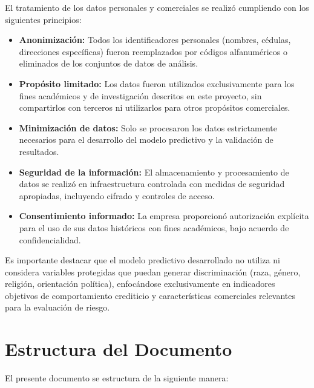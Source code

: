 El tratamiento de los datos personales y comerciales se realizó cumpliendo con los siguientes principios:

\begin{itemize}
    \item \textbf{Anonimización:} Todos los identificadores personales (nombres, cédulas, direcciones específicas) fueron reemplazados por códigos alfanuméricos o eliminados de los conjuntos de datos de análisis.
    
    \item \textbf{Propósito limitado:} Los datos fueron utilizados exclusivamente para los fines académicos y de investigación descritos en este proyecto, sin compartirlos con terceros ni utilizarlos para otros propósitos comerciales.
    
    \item \textbf{Minimización de datos:} Solo se procesaron los datos estrictamente necesarios para el desarrollo del modelo predictivo y la validación de resultados.
    
    \item \textbf{Seguridad de la información:} El almacenamiento y procesamiento de datos se realizó en infraestructura controlada con medidas de seguridad apropiadas, incluyendo cifrado y controles de acceso.
    
    \item \textbf{Consentimiento informado:} La empresa proporcionó autorización explícita para el uso de sus datos históricos con fines académicos, bajo acuerdo de confidencialidad.
\end{itemize}

Es importante destacar que el modelo predictivo desarrollado no utiliza ni considera variables protegidas que puedan generar discriminación (raza, género, religión, orientación política), enfocándose exclusivamente en indicadores objetivos de comportamiento crediticio y características comerciales relevantes para la evaluación de riesgo.

\section{Estructura del Documento}

El presente documento se estructura de la siguiente manera:

